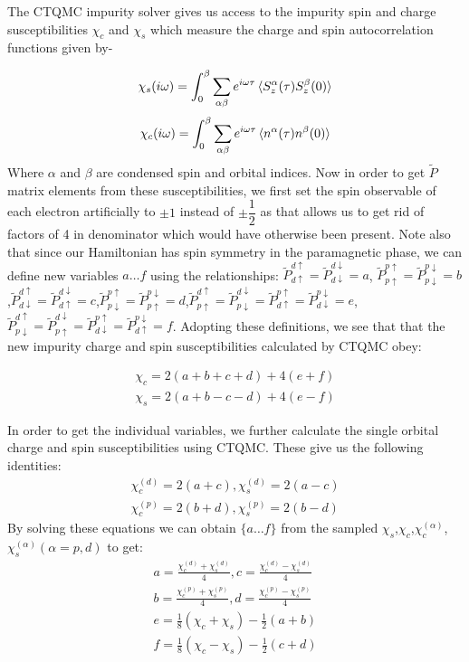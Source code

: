 \documentclass[10pt]{ruthesis}
\begin{document}
{ The CTQMC impurity solver gives us access to the impurity spin and charge susceptibilities $\chi _{c}$ and $\chi _{s}$ which measure the charge and spin autocorrelation functions given by-

\begin{equation}
\chi_{s}(i\omega)=\int_0^\beta \sum_{\alpha \beta}e^{i\omega\tau} \braket{ S_z^{\alpha}(\tau)  S_z^{\beta}(0)} 
\end{equation}
\begin{equation}
\chi_{c}(i\omega)=\int_0^\beta \sum_{\alpha \beta}e^{i\omega\tau} \braket{ n^{\alpha}(\tau)  n^{\beta}(0)}   
\end{equation}
Where $\alpha$ and $\beta$ are condensed spin and orbital indices. Now in order to get $\tilde{P}$ matrix elements from these susceptibilities, we first set the spin observable of each electron artificially to $\pm 1$ instead of $\pm \dfrac{1}{2}$ as that allows us to get rid of factors of 4 in denominator which would have otherwise been present. Note also that since our Hamiltonian has spin symmetry in the paramagnetic phase, we can define new variables ${a \ldots f}$ using the relationships: $\tilde P^{d\uparrow}_{d\uparrow}=\tilde P^{d\downarrow}_{d\downarrow}=a$,
$\tilde P^{p\uparrow}_{p\uparrow}=\tilde P^{p\downarrow}_{p\downarrow}=b$,$\tilde P^{d\uparrow}_{d\downarrow}=\tilde P^{d\downarrow}_{d\uparrow}=c$,$\tilde P^{p\uparrow}_{p\downarrow}=\tilde P^{p\downarrow}_{p\uparrow}=d$,$\tilde P^{d\uparrow}_{p\uparrow}=\tilde P^{d\downarrow}_{p\downarrow}=\tilde P^{p\uparrow}_{d\uparrow}=\tilde P^{p\downarrow}_{d\downarrow}=e$,$\tilde P^{d\uparrow}_{p\downarrow}=\tilde P^{d\downarrow}_{p\uparrow}=\tilde P^{p\uparrow}_{d\downarrow}=\tilde P^{p\downarrow}_{d\uparrow}=f$. Adopting these definitions, we see that that the new impurity charge and spin susceptibilities calculated by CTQMC obey:

\begin{eqnarray}
\chi_c=2(a+b+c+d)+4(e+f)\\ \nonumber \chi_s=2(a+b-c-d)+4(e-f)
\end{eqnarray}

In order to get the individual variables, we further calculate the single orbital charge and spin susceptibilities using CTQMC. These give us the following identities: 
\begin{eqnarray}
\chi^{(d)}_c=2(a+c),\chi^{(d)}_s=2(a-c)\nonumber\\
\chi^{(p)}_c=2(b+d),\chi^{(p)}_s=2(b-d)
\end{eqnarray}
By solving these equations we can obtain $\{a\ldots f\}$ from the sampled $\chi_s$,$\chi_c$,$\chi^{(\alpha)}_c$,$\chi^{(\alpha)}_s(\alpha=p,d)$ to get:
\begin{eqnarray}
a=\frac{\chi^{(d)}_c+\chi^{(d)}_s}{4},c=\frac{\chi^{(d)}_c-\chi^{(d)}_s}{4} \\
b=\frac{\chi^{(p)}_c+\chi^{(p)}_s}{4},d=\frac{\chi^{(p)}_c-\chi^{(p)}_s}{4} \\
e=\frac{1}{8}(\chi_c+\chi_s)-\frac{1}{2}(a+b)\\
f=\frac{1}{8}(\chi_c-\chi_s)-\frac{1}{2}(c+d)
\end{eqnarray}

}
\end{document}
